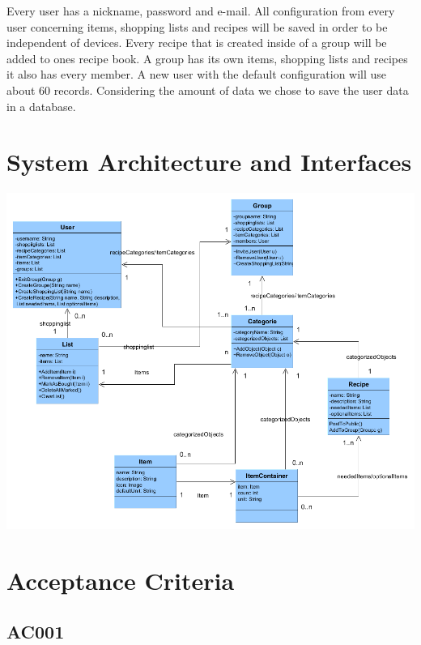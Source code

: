 \documentclass[12pt]{article}
\theoremstyle{definition}
\begin{document}
Every user has a nickname, password and e-mail. All configuration from every user concerning items, shopping lists and recipes will be saved in order to be independent of devices. Every recipe that is created inside of a group will be added to ones recipe book. A group has its own items, shopping lists and recipes it also has every member. A new user with the default configuration will use about 60 records. Considering the amount of data we chose to save the user data in a database. 

\pagebreak

\section{System Architecture and Interfaces}

\includegraphics[scale=.5]{UMLClassDiagram.png}

\pagebreak

\section{Acceptance Criteria}

\subsection{AC001}
\end{document}
